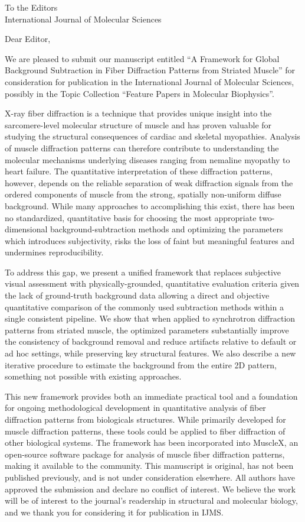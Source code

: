 \documentclass[11pt]{article}
\begin{document}
\noindent To the Editors\\
International Journal of Molecular Sciences

\vspace{1.5em}
\noindent Dear Editor,

We are pleased to submit our manuscript entitled ``A Framework for Global Background Subtraction in Fiber Diffraction Patterns from Striated Muscle'' for consideration for publication in the International Journal of Molecular Sciences, possibly in the Topic Collection  ``Feature Papers in Molecular Biophysics''.

X-ray fiber diffraction is a technique that provides unique insight into the sarcomere-level molecular structure of muscle and has proven valuable for studying the structural consequences of cardiac and skeletal myopathies. Analysis of muscle diffraction patterns can therefore contribute to understanding the molecular mechanisms underlying diseases ranging from nemaline myopathy to heart failure. The quantitative interpretation of these diffraction patterns, however, depends on the reliable separation of weak diffraction signals from the ordered components of muscle from the strong, spatially non-uniform diffuse background.  While many approaches to accomplishing this exist, there has been no standardized, quantitative basis for choosing the most appropriate two-dimensional background-subtraction methods and optimizing the parameters which introduces subjectivity, risks the loss of faint but meaningful features and undermines reproducibility. 


To address this gap, we present a unified framework that replaces subjective visual assessment with physically-grounded, quantitative evaluation criteria given the lack of ground-truth background data allowing a direct and objective quantitative comparison of the commonly used subtraction methods within a single consistent pipeline.  We show that when applied to synchrotron diffraction patterns from striated muscle, the optimized parameters substantially improve the consistency of background removal and reduce artifacts relative to default or ad hoc settings, while preserving key structural features.  We also describe a new iterative procedure to estimate the background from the entire 2D pattern, something not possible with existing approaches.  


This new framework provides both an immediate practical tool and a foundation for ongoing methodological development in quantitative analysis of fiber diffraction patterns from biologicals structures. While primarily developed for muscle diffraction patterns, these tools could be applied to fiber diffraction of other biological systems. The framework has been incorporated into MuscleX, an open-source software package for analysis of muscle fiber diffraction patterns, making it available to the community. This manuscript is original, has not been published previously, and is not under consideration elsewhere. All authors have approved the submission and declare no conflict of interest. We believe the work will be of interest to the journal’s readership in structural and molecular biology, and we thank you for considering it for publication in IJMS.
\end{document}
